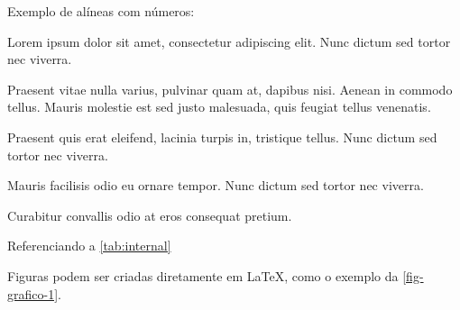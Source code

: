 
Exemplo de alíneas com números:

\begin{alineascomnumero}
	\item Lorem ipsum dolor sit amet, consectetur adipiscing elit. Nunc dictum sed tortor nec viverra.
	\item Praesent vitae nulla varius, pulvinar quam at, dapibus nisi. Aenean in commodo tellus. Mauris molestie est sed justo malesuada, quis feugiat tellus venenatis.
	\item Praesent quis erat eleifend, lacinia turpis in, tristique tellus. Nunc dictum sed tortor nec viverra.
	\item Mauris facilisis odio eu ornare tempor. Nunc dictum sed tortor nec viverra.
	\item Curabitur convallis odio at eros consequat pretium.
\end{alineascomnumero}

\lipsum[12]

\begin{table}[h!]	
	\centering
\end{table}

\lipsum[2] Referenciando a \autoref{tab:internal} \lipsum[2]

Figuras podem ser criadas diretamente em LaTeX,
como o exemplo da \ref{fig-grafico-1}.



